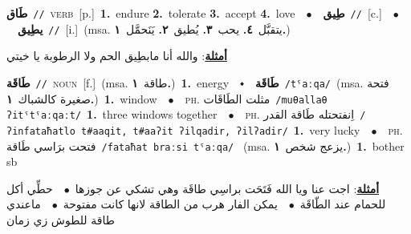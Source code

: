 \documentclass[10pt,a4paper,twoside]{article} %
\begin{document}
\begin{multicols}{2}
{\setlength\topsep{0pt}\textbf{\foreignlanguage{arabic}{طَاق}}\ {\color{gray}\texttt{//}\color{black}}\ \textsc{verb}\ [p.]\ \textbf{1.}~endure  \textbf{2.}~tolerate  \textbf{3.}~accept  \textbf{4.}~love\ \ $\bullet$\ \ \setlength\topsep{0pt}\textbf{\foreignlanguage{arabic}{طِيق}}\ {\color{gray}\texttt{//}\color{black}}\ [c.]\ \ $\bullet$\ \ \setlength\topsep{0pt}\textbf{\foreignlanguage{arabic}{يطِيق}}\ {\color{gray}\texttt{//}\color{black}}\ [i.]\ \color{gray}(msa. \foreignlanguage{arabic}{يتقبَّل}~\foreignlanguage{arabic}{\textbf{٤.}}  \foreignlanguage{arabic}{يحب}~\foreignlanguage{arabic}{\textbf{٣.}}  \foreignlanguage{arabic}{يُطيق}~\foreignlanguage{arabic}{\textbf{٢.}}  \foreignlanguage{arabic}{يَنَحمَّل}~\foreignlanguage{arabic}{\textbf{١.}})\color{black}\  \begin{flushright}\color{gray}\foreignlanguage{arabic}{\textbf{\underline{\foreignlanguage{arabic}{أمثلة}}}: والله أنا مابطِيق الحم ولا الرطوبة يا خيتي}\end{flushright}\color{black}} \vspace{2mm}

{\setlength\topsep{0pt}\textbf{\foreignlanguage{arabic}{طَاقَة}}\ {\color{gray}\texttt{//}\color{black}}\ \textsc{noun}\ [f.]\ \color{gray}(msa. \foreignlanguage{arabic}{طاقة}~\foreignlanguage{arabic}{\textbf{١.}})\color{black}\ \textbf{1.}~energy\ \ $\smblkdiamond$\ \ \setlength\topsep{0pt}\textbf{\foreignlanguage{arabic}{طَاقَة}}\ {\color{gray}\texttt{/tˤaːqa/}\color{black}}\ \color{gray}(msa. \foreignlanguage{arabic}{فتحة صغيرة كالشباك}~\foreignlanguage{arabic}{\textbf{١.}})\color{black}\ \textbf{1.}~window\ \ $\bullet$\ \ \textsc{ph.} \color{gray} \foreignlanguage{arabic}{مثلت الطَاقَات}\color{black}\ {\color{gray}\texttt{/{\sffamily muθallaθ ʔitˤtˤaːqaːt}/}\color{black}}\ \textbf{1.}~three windows together\ \ $\bullet$\ \ \textsc{ph.} \color{gray} \foreignlanguage{arabic}{اِنفتحتله طَاقة القدر}\color{black}\ {\color{gray}\texttt{/{\sffamily ʔinfataħatlo t\#aaqit, t\#aaʔit ʔilqadir, ʔilʔadir}/}\color{black}}\ \textbf{1.}~very lucky\ \ $\bullet$\ \ \textsc{ph.} \color{gray} \foreignlanguage{arabic}{فتحت برَاسي طَاقة}\color{black}\ {\color{gray}\texttt{/{\sffamily fataħat braːsi tˤaːqa}/}\color{black}}\ \color{gray} (msa. \foreignlanguage{arabic}{يزعج شخص}~\foreignlanguage{arabic}{\textbf{١.}})\color{black}\ \textbf{1.}~bother sb\  \begin{flushright}\color{gray}\foreignlanguage{arabic}{\textbf{\underline{\foreignlanguage{arabic}{أمثلة}}}: اجت عنا ويا الله فَتَحَت براسِي طاقَة وهي تشكي عن جوزها\ $\bullet$\ \  حطِّي أكل للحمام عند الطّاقَة\ $\bullet$\ \  يمكن الفار هرب من الطاقة لانها كانت مفتوحة\ $\bullet$\ \  ماعندي طاقة للطوش زي زمان}\end{flushright}\color{black}} \vspace{2mm}


\end{multicols}
\end{document}
